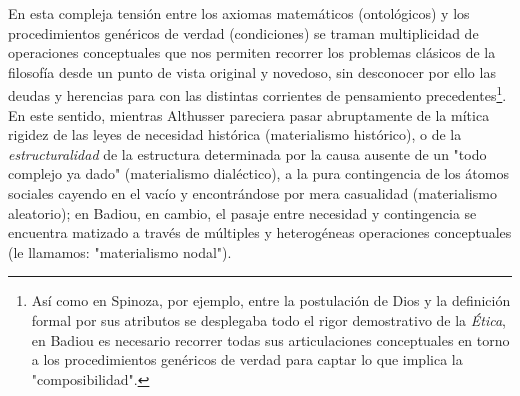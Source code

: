 En esta compleja tensión entre los axiomas matemáticos (ontológicos) y
los procedimientos genéricos de verdad (condiciones) se traman
multiplicidad de operaciones conceptuales que nos permiten recorrer los
problemas clásicos de la filosofía desde un punto de vista original y
novedoso, sin desconocer por ello las deudas y herencias para con las
distintas corrientes de pensamiento precedentes\footnote{Así como en
  Spinoza, por ejemplo, entre la postulación de Dios y la definición
  formal por sus atributos se desplegaba todo el rigor demostrativo de
  la \emph{Ética}, en Badiou es necesario recorrer todas sus
  articulaciones conceptuales en torno a los procedimientos genéricos de
  verdad para captar lo que implica la "composibilidad".}. En este
sentido, mientras Althusser pareciera pasar abruptamente de la mítica
rigidez de las leyes de necesidad histórica (materialismo histórico), o
de la \emph{estructuralidad} de la estructura determinada por la causa
ausente de un "todo complejo ya dado" (materialismo dialéctico), a la
pura contingencia de los átomos sociales cayendo en el vacío y
encontrándose por mera casualidad (materialismo aleatorio); en Badiou,
en cambio, el pasaje entre necesidad y contingencia se encuentra
matizado a través de múltiples y heterogéneas operaciones conceptuales
(le llamamos: "materialismo nodal").

